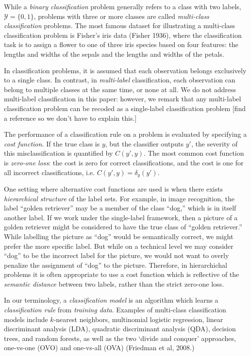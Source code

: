 \documentclass[12pt]{article}
\begin{document}
While a \emph{binary classification} problem generally refers to a
class with two labels, $\mathcal{Y} = \{0, 1\}$, problems with three
or more classes are called \emph{multi-class classification} problems.
The most famous dataset for illustrating a multi-class classification
problem is Fisher's iris data (Fisher 1936), where the classification
task is to assign a flower to one of three iris species based on four
features: the lengths and widths of the sepals and the lengths and
widths of the petals.

In classification problems, it is assumed that each observation
belongs exclusively to a single class.  In contrast,
in \emph{multi-label} classification, each observation can belong to
multiple classes at the same time, or none at all.  We do not address
multi-label classification in this paper: however, we remark that any
multi-label classification problem can be recoded as a single-label
classification problem [find a reference so we don't have to explain
this.]

The performance of a classification rule on a problem is evaluated by
specifying a \emph{cost function.}  If the true class is $y$, but the
classifier outputs $y'$, the severity of this misclassification is
quantified by $C(y', y)$.  The most common cost function
is \emph{zero-one loss}: the cost is zero for correct classifications,
and the cost is one for all incorrect classifications, i.e. $C(y', y)
= \delta_{y}(y').$

One setting where alternative cost functions are used is when there
exists \emph{hierarchical structure} of the label sets.  For example,
in image recognition, the label ``golden retriever'' may be a member
of the class ``dog,'' which is in itself another label.  If we work
under the single-label framework, then a picture of a golden retriever
might be considered to have the true class of ``golden retriever.''
While labelling the picture as ``dog'' would be semantically correct,
we might prefer the more specific label.  But while on a technical
level we may consider ``dog'' to be the incorrect label for the
picture, we would not want to overly penalize the assignment of
``dog'' to the picture.  Therefore, in hierarchichal problems it is
often appropriate to use a cost function which is reflective of
the \emph{semantic distance} between two labels, rather than the
strict zero-one loss.

In our terminology, a \emph{classification model} is an algorithm
which learns a \emph{classification rule} from \emph{training data}.
Examples of multi-class classification models include $k$-nearest
neighbors, multinomial logistic regression, linear discriminant
analysis (LDA), quadratic discriminant analysis (QDA), decision trees,
and random forests, as well as the two `divide and conquer'
approaches, one-vs-one (OVO) and one-vs-all (OVA) (Friedman et al,
2008.)
\end{document}
